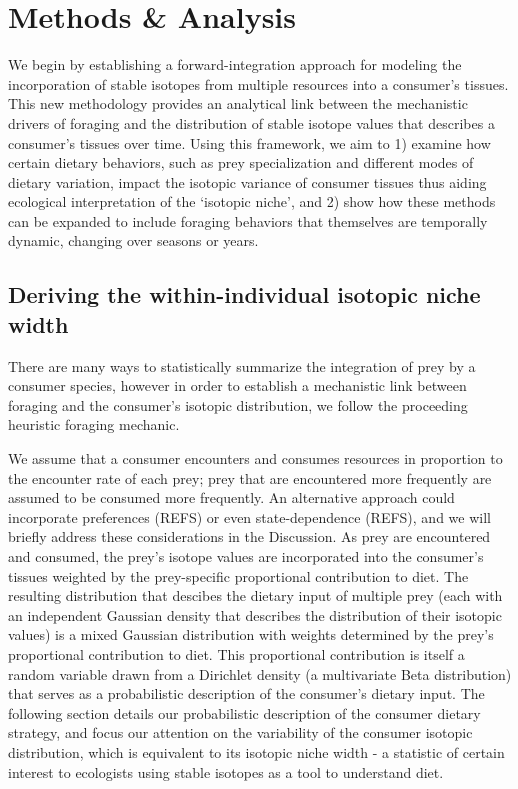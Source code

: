 \documentclass{frontiersSCNS}
\begin{document}
\section{Methods \& Analysis}
We begin by establishing a forward-integration approach for modeling the incorporation of stable isotopes from multiple resources into a consumer's tissues.
This new methodology provides an analytical link between the mechanistic drivers of foraging and the distribution of stable isotope values that describes a consumer's tissues over time.
Using this framework, we aim to
1) examine how certain dietary behaviors, such as prey specialization and different modes of dietary variation, impact the isotopic variance of consumer tissues thus aiding ecological interpretation of the `isotopic niche', and
2) show how these methods can be expanded to include foraging behaviors that themselves are temporally dynamic, changing over seasons or years.

\subsection*{Deriving the within-individual isotopic niche width}
There are many ways to statistically summarize the integration of prey by a consumer species, however in order to establish a mechanistic link between foraging and the consumer's isotopic distribution, we follow the proceeding heuristic foraging mechanic.

We assume that a consumer encounters and consumes resources in proportion to the encounter rate of each prey; prey that are encountered more frequently are assumed to be consumed more frequently.
An alternative approach could incorporate preferences (REFS) or even state-dependence (REFS), and we will briefly address these considerations in the Discussion.
As prey are encountered and consumed, the prey's isotope values are incorporated into the consumer's tissues weighted by the prey-specific proportional contribution to diet.
The resulting distribution that descibes the dietary input of multiple prey (each with an independent Gaussian density that describes the distribution of their isotopic values) is a mixed Gaussian distribution with weights determined by the prey's proportional contribution to diet.
This proportional contribution is itself a random variable drawn from a Dirichlet density (a multivariate Beta distribution) that serves as a probabilistic description of the consumer's dietary input.
The following section details our probabilistic description of the consumer dietary strategy, and focus our attention on the variability of the consumer isotopic distribution, which is equivalent to its isotopic niche width - a statistic of certain interest to ecologists using stable isotopes as a tool to understand diet.
\end{document}
